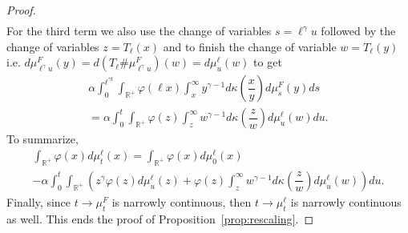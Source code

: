 \documentclass[10pt]{amsart}
\theoremstyle{definition}\newtheorem{defi}[theo]{Definition}\newtheorem{rema}[theo]{Remark}\newtheorem{exam}[theo]{Example}\newtheorem{exem}[theo]{Example}\newtheorem{nota}[theo]{Notation}
\newcommand*\dst{\displaystyle}
\renewcommand*\a{\alpha}
\newcommand*\R{\mathbb{R}}
\begin{document}
\begin{proof}
\begin{align*}
\end{align*}
For the third term we also use the change of variables $s=\ell^{\gamma}u$ followed by the change of variables $z=T_{\ell}(x)$ and to finish the change of variable $w=T_\ell (y)$ i.e. $d\mu_{\ell^{\gamma}u}^{F}(y)= d (T_{\ell} \#\mu_{\ell^{\gamma}u}^{F})(w)=d\mu_u^\ell(w)$ to get
\begin{multline*}
\a \dst\int_0^{\ell^{\gamma t}} \dst\int_{\R^+}
\varphi(\ell x)\dst\int_x^{\infty}y^{\gamma-1} d\kappa\left(\dfrac{x}{y}\right)d\mu_s^{F}(y)ds \\
=\a \dst\int_0^{t} \dst\int_{\R^+}
\varphi(z)\dst\int_z^{\infty}w^{\gamma-1} d\kappa\left(\dfrac{z}{w}\right)d\mu_u^{\ell}(w)du.
\end{multline*}
To summarize,
\begin{multline*}
\dst\int_{\R^+} \varphi(x) d\mu_t^{\ell}(x) =
\dst\int_{\R^+} \varphi(x) d\mu_0^{\ell}(x)\\
-\a \dst\int_0^{t} \dst\int_{\R^+}
\left(z^{\gamma} \varphi(z)d\mu_u^{\ell}(z)+
\varphi(z)\dst\int_z^{\infty}w^{\gamma-1} d\kappa\left(\dfrac{z}{w}\right)d\mu_u^{\ell}(w) \right)du.
\end{multline*}
Finally, since $t\to \mu_t^{F}$ is narrowly continuous, then $t\to \mu_t^{\ell}$ is narrowly continuous as well. This ends the proof of Proposition~\ref{prop:rescaling}.
\end{proof}
\end{document}

